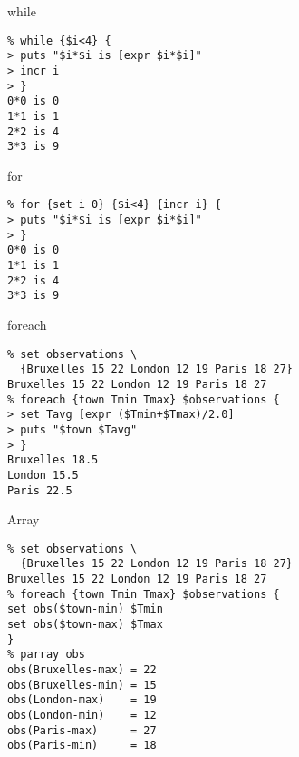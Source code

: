 \begin{frame}[containsverbatim]{while}
\lstset{language=tcl}
\begin{lstlisting}
% while {$i<4} {
> puts "$i*$i is [expr $i*$i]"
> incr i
> }
0*0 is 0
1*1 is 1
2*2 is 4
3*3 is 9
\end{lstlisting}
\end{frame}


\begin{frame}[containsverbatim]{for}
\lstset{language=tcl}
\begin{lstlisting}
% for {set i 0} {$i<4} {incr i} {
> puts "$i*$i is [expr $i*$i]"
> }
0*0 is 0
1*1 is 1
2*2 is 4
3*3 is 9
\end{lstlisting}
\end{frame}

\begin{frame}[containsverbatim]{foreach}
\lstset{language=tcl}
\begin{lstlisting}
% set observations \
  {Bruxelles 15 22 London 12 19 Paris 18 27}
Bruxelles 15 22 London 12 19 Paris 18 27
% foreach {town Tmin Tmax} $observations {
> set Tavg [expr ($Tmin+$Tmax)/2.0]
> puts "$town $Tavg"
> }
Bruxelles 18.5
London 15.5
Paris 22.5
\end{lstlisting}
\end{frame}



\begin{frame}[containsverbatim]{Array}
\lstset{language=tcl}
\begin{lstlisting}
% set observations \
  {Bruxelles 15 22 London 12 19 Paris 18 27}
Bruxelles 15 22 London 12 19 Paris 18 27
% foreach {town Tmin Tmax} $observations {
set obs($town-min) $Tmin
set obs($town-max) $Tmax
}
% parray obs
obs(Bruxelles-max) = 22
obs(Bruxelles-min) = 15
obs(London-max)    = 19
obs(London-min)    = 12
obs(Paris-max)     = 27
obs(Paris-min)     = 18
\end{lstlisting}
\end{frame}



